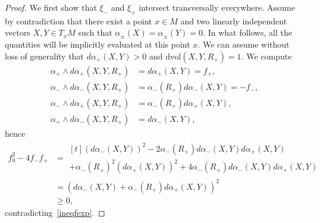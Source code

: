 \documentclass[letterpaper, 11pt]{article}
\numberwithin{equation}{section}
\begin{document}
\begin{proof}
We first show that $\xi_-$ and $\xi_+$ intersect transversally everywhere. Assume by contradiction that there exist a point $x \in M$ and two linearly independent vectors $X, Y \in T_xM$ such that $\alpha_\pm(X) = \alpha_\pm(Y) = 0$. In what follows, all the quantities will be implicitly evaluated at this point $x$. We can assume without loss of generality that $d \alpha_+(X,Y) >0$ and $\mathrm{dvol}(X,Y,R_+)=1$. We compute
\begin{align*}
\alpha_+ \wedge d\alpha_+ (X,Y,R_+) &= d\alpha_+(X,Y) = f_+, \\
\alpha_- \wedge d\alpha_- (X,Y,R_+) &= \alpha_-(R_+) d\alpha_-(X,Y) = -f_-,\\
\alpha_- \wedge d\alpha_+ (X,Y,R_+) &= \alpha_-(R_+) d\alpha_+(X,Y),\\
\alpha_+ \wedge d\alpha_- (X,Y,R_+) &= d\alpha_-(X,Y),
\end{align*}
hence
\begin{align*}
f_0^2 - 4f_-f_+ &= 
\begin{multlined}[t] (d\alpha_-(X,Y))^2 - 2 \alpha_-(R_+) d\alpha_-(X,Y) d\alpha_+(X,Y) \\+ \alpha_-(R_+)^2 (d\alpha_+(X,Y))^2  
+4 \alpha_-(R_+) d\alpha_-(X,Y) d\alpha_+(X,Y)
\end{multlined}\\
&= \left(d\alpha_-(X,Y) + \alpha_-(R_+) d\alpha_+(X,Y) \right)^2\\
&\geq 0,
\end{align*}
contradicting~\eqref{ineqfexp}.


\end{proof}
\end{document}
